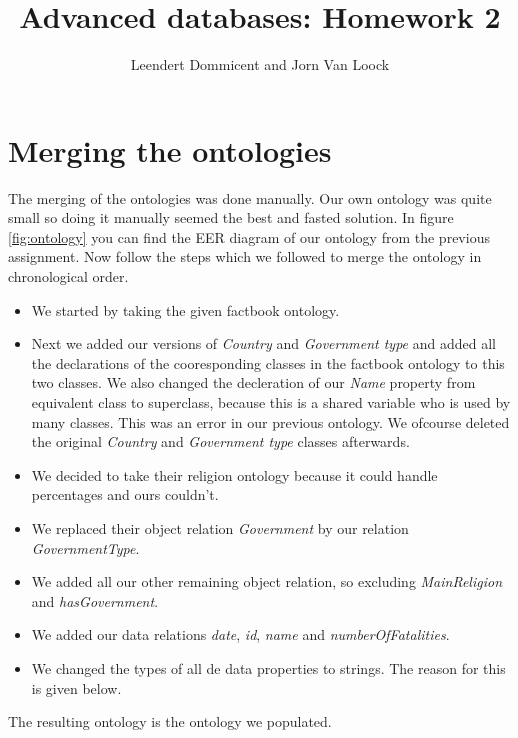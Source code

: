 \documentclass{article}
\title{Advanced databases: Homework 2}
\author{Leendert Dommicent and Jorn Van Loock}
\begin{document}
\maketitle
\section{Merging the ontologies}
The merging of the ontologies was done manually. Our own ontology was quite small so doing it manually seemed the best and fasted solution. In figure \ref{fig:ontology} you can find the EER diagram of our ontology from the previous assignment. Now follow the steps which we followed to merge the ontology in chronological order.
\begin{itemize}
\item We started by taking the given factbook ontology.
\item Next we added our versions of \textit{Country} and \textit{Government type} and added all the declarations of the cooresponding classes in the factbook ontology to this two classes. We also changed the decleration of our \textit{Name} property from equivalent class to superclass, because this is a shared variable who is used by many classes. This was an error in our previous ontology. We ofcourse deleted the original \textit{Country} and \textit{Government type} classes afterwards.
\item We decided to take their religion ontology because it could handle percentages and ours couldn't.
\item We replaced their object relation \textit{Government} by our relation \textit{GovernmentType}.
\item We added all our other remaining object relation, so excluding \textit{MainReligion} and \textit{hasGovernment}.
\item We added our data relations \textit{date}, \textit{id}, \textit{name} and \textit{numberOfFatalities}.
\item We changed the types of all de data properties to strings. The reason for this is given below.
\end{itemize}
The resulting ontology is the ontology we populated.
\end{document}
